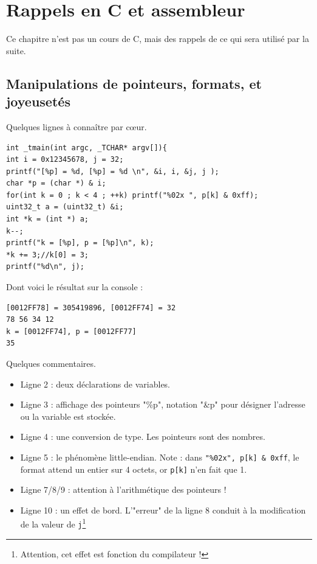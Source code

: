 \documentclass{book}
\newcommand{\code}[1]{\texttt{#1}}
\begin{document}
\chapter{Rappels en C et assembleur}

Ce chapitre n'est pas un cours de C, mais des rappels de ce qui sera utilisé par la suite. 

\section{Manipulations de pointeurs, formats, et joyeusetés}

Quelques lignes à connaître par c\oe ur. 

\begin{verbatim}
int _tmain(int argc, _TCHAR* argv[]){
int i = 0x12345678, j = 32;
printf("[%p] = %d, [%p] = %d \n", &i, i, &j, j );
char *p = (char *) & i;
for(int k = 0 ; k < 4 ; ++k) printf("%02x ", p[k] & 0xff);
uint32_t a = (uint32_t) &i;
int *k = (int *) a;
k--;
printf("k = [%p], p = [%p]\n", k);
*k += 3;//k[0] = 3;
printf("%d\n", j);
\end{verbatim}

Dont voici le résultat sur la console : 

\begin{verbatim}
[0012FF78] = 305419896, [0012FF74] = 32
78 56 34 12 
k = [0012FF74], p = [0012FF77]
35
\end{verbatim}

Quelques commentaires. 

\begin{itemize}
	\item Ligne 2 : deux déclarations de variables.
	\item Ligne 3 : affichage des pointeurs "\%p", notation "\&p" pour désigner l'adresse ou la variable est stockée. 
	\item Ligne 4 : une conversion de type. Les pointeurs sont des nombres. 
	\item Ligne 5 : le phénomène little-endian. Note : dans \code{"\%02x", p[k] \& 0xff}, le format attend un entier sur 4 octets, or \code{p[k]} n'en fait que 1.
	\item Ligne 7/8/9 : attention à l'arithmétique des pointeurs !
	\item Ligne 10 : un effet de bord. L'"erreur" de la ligne 8 conduit à la modification de la valeur de \code{j}\footnote{Attention, cet effet est fonction du compilateur !}
\end{itemize}
\end{document}
